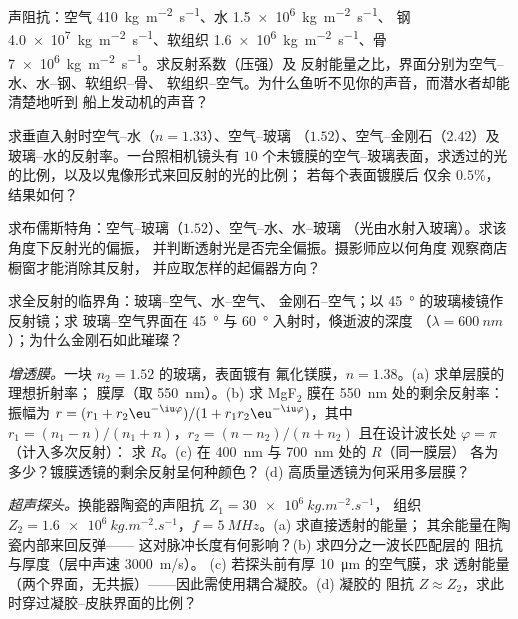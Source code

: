 \begin{exercise}[$\star$]\label{exo:b2:wave-interfaces:1}
声阻抗：空气 \qty{410}{kg.m^{-2}.s^{-1}}、水 \qty{1.5e6}{kg.m^{-2}.s^{-1}}、
钢 \qty{4.0e7}{kg.m^{-2}.s^{-1}}、软组织 \qty{1.6e6}{kg.m^{-2}.s^{-1}}、骨
\qty{7e6}{kg.m^{-2}.s^{-1}}。求反射系数（压强）及
反射能量之比，界面分别为空气–水、水–钢、软组织–骨、
软组织–空气。为什么鱼听不见你的声音，而潜水者却能清楚地听到
船上发动机的声音？
\end{exercise}

\begin{exercise}[$\star$]\label{exo:b2:wave-interfaces:2}
求垂直入射时空气–水（$n = 1.33$）、空气–玻璃
（$1.52$）、空气–金刚石（$2.42$）及玻璃–水的反射率。一台照相机镜头有 $10$
个未镀膜的空气–玻璃表面，求透过的光的比例，以及以鬼像形式来回反射的光的比例；
若每个表面镀膜后
仅余 $0.5\%$，结果如何？
\end{exercise}

\begin{exercise}[$\star$]\label{exo:b2:wave-interfaces:3}
求布儒斯特角：空气–玻璃（$1.52$）、空气–水、水–玻璃
（光由水射入玻璃）。求该角度下反射光的偏振，
并判断透射光是否完全偏振。摄影师应以何角度
观察商店橱窗才能消除其反射，
并应取怎样的起偏器方向？
\end{exercise}

\begin{exercise}[$\star$]\label{exo:b2:wave-interfaces:4}
求全反射的临界角：玻璃–空气、水–空气、
金刚石–空气；以 \qty{45}{\degree} 的玻璃棱镜作反射镜；求
玻璃–空气界面在 \qty{45}{\degree} 与 \qty{60}{\degree} 入射时，倏逝波的深度
（$\lambda = \qty{600}{nm}$）；为什么金刚石如此璀璨？
\end{exercise}

\begin{exercise}[$\star\star$]\label{exo:b2:wave-interfaces:5}
\emph{增透膜。}一块 $n_2 = 1.52$ 的玻璃，表面镀有
氟化镁膜，$n = 1.38$。(a) 求单层膜的理想折射率；
膜厚（取 \qty{550}{nm}）。(b) 求 MgF$_2$ 膜在
\qty{550}{nm} 处的剩余反射率：振幅为 $r = (r_1 + r_2\eu^{-\iu\varphi})/(1 + r_1r_2
\eu^{-\iu\varphi})$，其中 $r_1 = (n_1 - n)/(n_1 + n)$，$r_2 = (n - n_2)/(n + n_2)$
且在设计波长处 $\varphi = \pi$（计入多次反射）：
求 $R$。(c) 在 \qty{400}{nm} 与 \qty{700}{nm} 处的 $R$（同一膜层）
各为多少？镀膜透镜的剩余反射呈何种颜色？
(d) 高质量透镜为何采用多层膜？
\end{exercise}

\begin{exercise}[$\star\star$]\label{exo:b2:wave-interfaces:6}
\emph{超声探头。}换能器陶瓷的声阻抗 $Z_1 = \qty{30e6}{kg.m^{-2}.s^{-1}}$，
组织 $Z_2 = \qty{1.6e6}{kg.m^{-2}.s^{-1}}$，$f = \qty{5}{MHz}$。(a) 求直接透射的能量；
其余能量在陶瓷内部来回反弹——
这对脉冲长度有何影响？(b) 求四分之一波长匹配层的
阻抗与厚度（层中声速 \qty{3000}{m/s}）。
(c) 若探头前有厚 \qty{10}{\micro m} 的空气膜，求
透射能量（两个界面，无共振）——因此需使用耦合凝胶。(d) 凝胶的
阻抗 $Z \approx Z_2$，求此时穿过凝胶–皮肤界面的比例？
\end{exercise}

